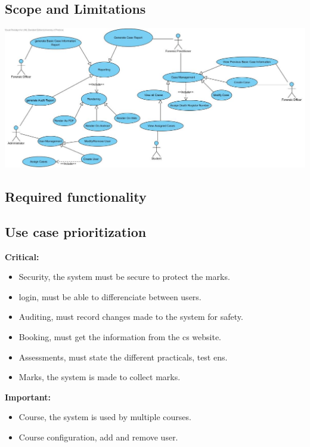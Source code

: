 \documentclass[10pt,a4paper]{article}
\begin{document}
\subsection{Scope and Limitations}

\begin{center}
\includegraphics[scale=0.5]{DRUC.jpg}
\end{center}


\subsection{Required functionality}




\subsection{Use case prioritization}

\textbf{Critical:}
 \begin{itemize}
	\item Security, the system must be secure to protect the marks.

	\item login, must be able to differenciate between users. 

	\item Auditing, must record changes made to the system for safety. 

	\item Booking, must get the information from the cs website.

	\item Assessments, must state the different practicals, test ens.

	\item Marks, the system is made to collect marks.
 \end{itemize}
 
 
 
\textbf{Important:}
\begin{itemize}
	\item Course, the system is used by multiple courses.

	\item Course configuration, add and remove user.
 \end{itemize}
\end{document}
